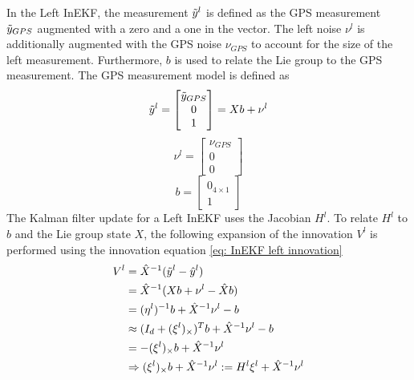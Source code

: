 In the Left InEKF, the measurement $\Tilde{y}^l$ is defined as the GPS measurement $\Tilde{y}_{GPS}$ augmented with a zero and a one in the vector. The left noise $\nu^l$ is additionally augmented with the GPS noise $\nu_{GPS}$ to account for the size of the left measurement. Furthermore, $b$ is used to relate the Lie group to the GPS measurement. The GPS measurement model is defined as 
\begin{equation}
    \Tilde{y}^l = \begin{bmatrix}
        \Tilde{y}_{GPS} \\
        0 \\
        1
    \end{bmatrix} = X b + \nu^l
    \label{eq: y meas LInEKF}
\end{equation}
\begin{equation}
    \nu^l = \begin{bmatrix}
        \nu_{GPS} \\
        0 \\
        0
    \end{bmatrix}
    \label{eq: left measurment noise}
\end{equation}
\begin{equation}
    b = \begin{bmatrix}
        0_{4 \times 1} \\
        1
    \end{bmatrix}
    \label{eq: b LInEKF}
\end{equation}
The Kalman filter update for a Left InEKF uses the Jacobian $H^l$. To relate $H^l$ to $b$ and the Lie group state $X$, the following expansion of the innovation $V^l$ is performed using the innovation equation \eqref{eq: InEKF left innovation}
\begin{equation}
    \begin{split}
        V^l &= \hat{X}^{-1} (\Tilde{y}^l  - \hat{y}^l ) \\
            &= \hat{X}^{-1} (X b + \nu^l - \hat{X} b) \\
            &= (\eta^l)^{-1} b + \hat{X}^{-1} \nu^l - b \\
            &\approx (I_d + (\xi^l)_{\times})^T b + \hat{X}^{-1} \nu^l - b \\
            &= -(\xi^l)_{\times} b + \hat{X}^{-1} \nu^l  \\
            &\Rightarrow (\xi^l)_{\times} b + \hat{X}^{-1} \nu^l := H^l \xi^l + \hat{X}^{-1} \nu^l
        \label{eq: H proof for LInEKF}
    \end{split}
\end{equation}
